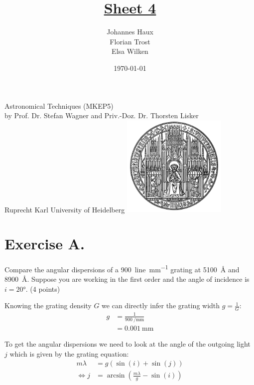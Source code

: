 \documentclass[11pt,a4paper,twoside]{article}
\title{\LARGE \underline {Sheet 4}}
\author{Johannes Haux \\ Florian Trost \\ Elsa Wilken}
\date{\today}
\begin{document}
\maketitle
\thispagestyle{empty}

\begin{center}
  Astronomical Techniques (MKEP5) \\
  \baselineskip35pt
  by Prof. Dr. Stefan Wagner and Priv.-Doz. Dr. Thorsten Lisker \\
  \baselineskip60pt
  Ruprecht Karl University of Heidelberg
\vskip 40pt
\includegraphics[width=5cm]{pic/UniHD.png}

\end{center}

\newpage
\setcounter{page}{1}		%

\section*{Exercise A.}

Compare the angular dispersions of a \SI{900}{line\per\milli\meter} grating at 
\SI{5100}{\angstrom} and \SI{8900}{\angstrom}. Suppose you are working in the 
first order and the angle of incidence is $i = \ang{20}$. (4 points)
\newline

Knowing the grating density $G$ we can directly infer the grating width $g = 
\frac{1}{G}$:
\begin{align}
    g   &= \frac{1}{\SI{900}{\per\milli\meter}} \\
        &= \SI{0.001}{\milli\meter}
\end{align}

To get the angular dispersions we need to look at the angle of the outgoing
light $j$ which is given by the grating equation:
\begin{align}
    m\lambda &= g\left( \sin(i) + \sin(j) \right)  \\
    \Leftrightarrow j &= \arcsin\left( \frac{m\lambda}{g} - \sin(i)\right)
\end{align}
\end{document}
